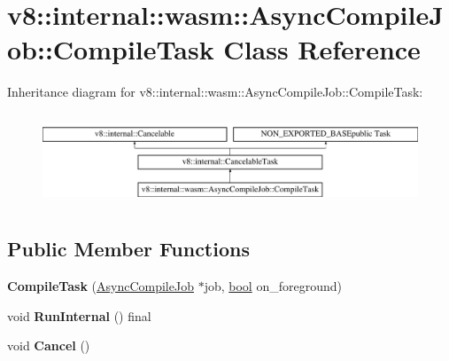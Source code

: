 \hypertarget{classv8_1_1internal_1_1wasm_1_1AsyncCompileJob_1_1CompileTask}{}\section{v8\+:\+:internal\+:\+:wasm\+:\+:Async\+Compile\+Job\+:\+:Compile\+Task Class Reference}
\label{classv8_1_1internal_1_1wasm_1_1AsyncCompileJob_1_1CompileTask}
Inheritance diagram for v8\+:\+:internal\+:\+:wasm\+:\+:Async\+Compile\+Job\+:\+:Compile\+Task\+:\begin{figure}[H]
\begin{center}
\leavevmode
\includegraphics[height=2.763158cm]{classv8_1_1internal_1_1wasm_1_1AsyncCompileJob_1_1CompileTask}
\end{center}
\end{figure}
\subsection*{Public Member Functions}
\begin{DoxyCompactItemize}
\item 
\mbox{\label{classv8_1_1internal_1_1wasm_1_1AsyncCompileJob_1_1CompileTask_ab9b5e4559ae086d12357cb0349cc18b4}} 
{\bfseries Compile\+Task} (\mbox{\hyperlink{classv8_1_1internal_1_1wasm_1_1AsyncCompileJob}{Async\+Compile\+Job}} $\ast$job, \mbox{\hyperlink{classbool}{bool}} on\+\_\+foreground)
\item 
\mbox{\label{classv8_1_1internal_1_1wasm_1_1AsyncCompileJob_1_1CompileTask_ada0c2b9f7ae434853a08d3a84a017d06}} 
void {\bfseries Run\+Internal} () final
\item 
\mbox{\label{classv8_1_1internal_1_1wasm_1_1AsyncCompileJob_1_1CompileTask_a204415cbd9628d948c738372bcc6139a}} 
void {\bfseries Cancel} ()
\end{DoxyCompactItemize}
